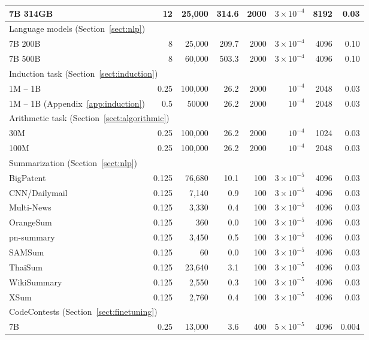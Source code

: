 \begin{table}[H]
{\begin{tabular}{lrrrrrrr}
        \cmidrule(r{2em}){1-2}
        7B 314GB & 12 & 25,000 & 314.6 & 2000 & $3 \times 10^{-4}$ & 8192 & 0.03 \\
        \midrule
        \multicolumn{2}{l}{Language models (Section~\ref{sect:nlp})} \\
        \cmidrule(r{2em}){1-2}
        7B 200B & 8 & 25,000 & 209.7 & 2000 & $3 \times 10^{-4}$ & 4096 & 0.10 \\
        7B 500B & 8 & 60,000 & 503.3 & 2000 & $3 \times 10^{-4}$ & 4096 & 0.10 \\
        \midrule
        \multicolumn{2}{l}{Induction task (Section~\ref{sect:induction})} \\
        \cmidrule(r{3em}){1-2}
        1M -- 1B& 0.25 & 100,000 & 26.2 & 2000 & $10^{-4}$ & 2048 & 0.03 \\
        1M -- 1B (Appendix~\ref{app:induction}) & 0.5 & 50000 & 26.2 & 2000 & $10^{-4}$ & 2048 & 0.03 \\
        \midrule
        \multicolumn{2}{l}{Arithmetic task (Section~\ref{sect:algorithmic})} \\
        \cmidrule(r{3em}){1-2}
        30M & 0.25 & 100,000 & 26.2 & 2000 & $10^{-4}$ & 1024 & 0.03 \\
        100M & 0.25 & 100,000 & 26.2 & 2000 & $10^{-4}$ & 2048 & 0.03 \\
        \midrule
        \multicolumn{2}{l}{Summarization (Section~\ref{sect:nlp})} \\
        \cmidrule(r{3em}){1-2}
        BigPatent & 0.125 & 76,680 & 10.1 & 100 & $3 \times 10^{-5}$ & 4096 & 0.03 \\
        CNN/Dailymail & 0.125 & 7,140 & 0.9 & 100 & $3 \times 10^{-5}$ & 4096 & 0.03 \\
        Multi-News & 0.125 & 3,330 & 0.4 & 100 & $3 \times 10^{-5}$ & 4096 & 0.03 \\
        OrangeSum & 0.125 & 360 & 0.0 & 100 & $3 \times 10^{-5}$ & 4096 & 0.03 \\
        pn-summary & 0.125 & 3,450 & 0.5 & 100 & $3 \times 10^{-5}$ & 4096 & 0.03 \\
        SAMSum & 0.125 & 60 & 0.0 & 100 & $3 \times 10^{-5}$ & 4096 & 0.03 \\
        ThaiSum & 0.125 & 23,640 & 3.1 & 100 & $3 \times 10^{-5}$ & 4096 & 0.03 \\
        WikiSummary & 0.125 & 2,550 & 0.3 & 100 & $3 \times 10^{-5}$ & 4096 & 0.03 \\
        XSum & 0.125 & 2,760 & 0.4 & 100 & $3 \times 10^{-5}$ & 4096 & 0.03 \\
        \midrule
        \multicolumn{2}{l}{CodeContests (Section~\ref{sect:finetuning})} \\
        \cmidrule(r{3em}){1-2}
        7B & 0.25 & 13,000 & 3.6 & 400 & $5 \times 10^{-5}$ & 4096 & 0.004 \\
        \bottomrule
    \end{tabular}}
\end{table}
